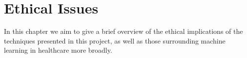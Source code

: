 \chapter{Ethical Issues} \label{sec:ethics}

In this chapter we aim to give a brief overview of the ethical implications of the techniques presented in this project, as well as those surrounding machine learning in healthcare more broadly.